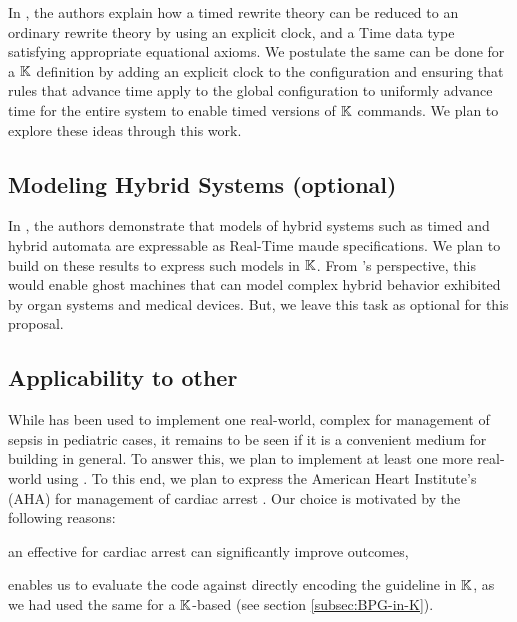 In \cite{OlveczkyTCS02}, the authors explain how a timed rewrite theory
can be reduced to an ordinary rewrite theory by using an explicit clock, and
a Time data type satisfying appropriate equational axioms. We postulate
the same can be done for a $\mathbb{K}$ definition by adding an explicit clock to the
configuration and ensuring that rules that advance time apply to the global
configuration to uniformly advance time for the entire system to enable
timed versions of $\mathbb{K}$ commands. We plan to explore these ideas through
this work.

\subsection{Modeling Hybrid Systems (optional)}

In \cite{OlveczkyTCS02}, the authors demonstrate that models of hybrid systems
such as timed and hybrid automata are expressable as Real-Time maude specifications.
We plan to build on these results to express such models in $\mathbb{K}$. From
\MediK's perspective, this would enable ghost machines that can model
complex hybrid behavior exhibited by organ systems and medical devices.
But, we leave this task as optional for this proposal.


\subsection{Applicability to other \CDSSs{}}\label{subsec:applicability}

While \MediK{} has been used to implement one real-world, complex
\CDSSs{} for management of sepsis in pediatric cases, it remains
to be seen if it is a convenient medium for building \CDSSs{} in general.
To answer this, we plan to implement at least one more real-world \CDSS{}
using \MediK{}. To this end, we plan to express the American Heart Institute's
(AHA) \BPG{} for management of cardiac arrest \cite{AHAUrl}. Our choice
is motivated by the following reasons:
\begin{enumerate*}[label=(\roman*)]
  \item an effective \CDSS{} for cardiac arrest can significantly improve
    outcomes,
  \item enables us to evaluate the \MediK{} code against directly encoding
    the guideline in $\mathbb{K}$, as we had used the same \BPG{} for a $\mathbb{K}$-based \CDSSs{}
    (see section \ref{subsec:BPG-in-K}).
\end{enumerate*}

